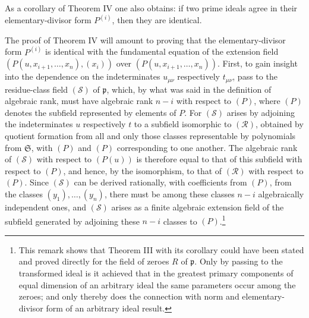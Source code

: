 \documentclass[11pt]{article}
\providecommand{\frakS}{\mathfrak S}
\providecommand{\frakp}{\mathfrak p}
\begin{document}
As a corollary of Theorem IV one also obtains: if two prime ideals agree in their elementary-divisor form $P^{(i)}$, then they are identical.

The proof of Theorem IV will amount to proving that the elementary-divisor form $P^{(i)}$ is identical with the fundamental equation of the extension field $(P(u,x_{i+1},\ldots,x_n),(x_i))$ over $(P(u,x_{i+1},\ldots,x_n))$. First, to gain insight into the dependence on the indeterminates $u_{\mu\nu}$ respectively $t_{\mu\nu}$, pass to the residue-class field $(\mathcal S)$ of $\frakp$, which, by what was said in the definition of algebraic rank, must have algebraic rank $n-i$ with respect to $(P)$, where $(P)$ denotes the subfield represented by elements of $P$. For $(\mathcal S)$ arises by adjoining the indeterminates $u$ respectively $t$ to a subfield isomorphic to $(\mathcal R)$, obtained by quotient formation from all and only those classes representable by polynomials from $\frakS$, with $(P)$ and $(P)$ corresponding to one another. The algebraic rank of $(\mathcal S)$ with respect to $(P(u))$ is therefore equal to that of this subfield with respect to $(P)$, and hence, by the isomorphism, to that of $(\mathcal R)$ with respect to $(P)$. Since $(\mathcal S)$ can be derived rationally, with coefficients from $(P)$, from the classes $(y_1),\ldots,(y_n)$, there must be among these classes $n-i$ algebraically independent ones, and $(\mathcal S)$ arises as a finite algebraic extension field of the subfield generated by adjoining these $n-i$ classes to $(P)$.\footnote{This remark shows that Theorem III with its corollary could have been stated and proved directly for the field of zeroes $R$ of $\frakp$. Only by passing to the transformed ideal is it achieved that in the greatest primary components of equal dimension of an arbitrary ideal the same parameters occur among the zeroes; and only thereby does the connection with norm and elementary-divisor form of an arbitrary ideal result.}
\end{document}
